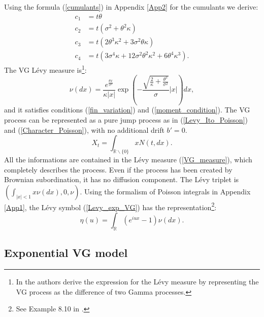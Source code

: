 \documentclass[]{interact}
\newcommand{\numberset}{\mathbb}
\newcommand{\R}{\numberset{R}}
\theoremstyle{plain}%
\theoremstyle{definition}
\theoremstyle{remark}
\begin{document}
Using the formula (\ref{cumulants}) in Appendix \ref{App2} for the cumulants we derive:
\begin{align}\label{VG_cumulants}
 c_1 &= t\theta \\ \nonumber
 c_2 &= t(\sigma^2 + \theta^2 \kappa) \\ \nonumber
 c_3 &= t (2\theta^3\kappa^2 + 3 \sigma^2 \theta \kappa) \\ \nonumber
 c_4 &= t (3\sigma^4 \kappa + 12\sigma^2 \theta^2 \kappa^2 +6\theta^4\kappa^3)\nonumber . 
\end{align}
The VG Lévy measure is\footnote{In \cite{MCC98} the authors derive the expression for the Lévy measure 
by representing the VG process as the difference of two Gamma processes.}:
\begin{equation}\label{VG_measure}
 \nu(dx) = \frac{e^{\frac{\theta x}{\sigma^2}}}{\kappa|x|} \exp 
 \left( - \frac{\sqrt{\frac{2}{\kappa} + \frac{\theta^2}{\sigma^2}}}{\sigma} |x|\right) dx,
\end{equation}
and it satisfies conditions (\ref{fin_variation}) and (\ref{moment_condition}). 
The VG process can be represented as a 
pure jump process as in (\ref{Levy_Ito_Poisson}) and (\ref{Character_Poisson}), with no additional drift $b'=0$.
\begin{equation}\label{Poisson_VG}
 X_t = \int_{\R \backslash \{0\}} x N(t,dx).
\end{equation}
All the informations are contained in the Lévy measure (\ref{VG_measure}),
which completely describes the process. Even if the process has been created by Brownian
subordination, it has no diffusion component.  
The L\'evy triplet is $( \int_{|x|<1} x \nu(dx), 0, \nu)$.
Using the formalism of Poisson integrals in Appendix \ref{App1}, the Lévy symbol (\ref{Levy_exp_VG}) 
has the representation\footnote{See Example 8.10 in \cite{Sato}.}:
\begin{equation}
 \eta(u) =\int_{\R} (e^{iux} -1) \nu(dx). 
\end{equation}


\subsection{Exponential VG model}
\end{document}
